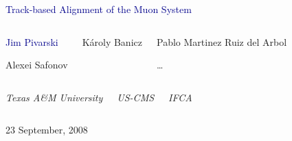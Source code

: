 \documentclass[compress]{beamer}
\begin{document}
\begin{frame}
\vfill
\begin{center}
\textcolor{darkblue}{\Large Track-based Alignment of the Muon System}

\vfill
\begin{columns}
\begin{center}
\large
\textcolor{darkblue}{Jim Pivarski}

\vspace{0.2 cm}
Alexei Safonov
\end{center}

\begin{center}
\large
K\'aroly Banicz
\end{center}

\begin{center}
\large
Pablo Martinez Ruiz del Arbol

\vspace{0.2 cm}
\ldots
\end{center}
\end{columns}

\begin{columns}
\begin{center}
\scriptsize
{\it Texas A\&M University}
\end{center}
\begin{center}
\scriptsize
{\it US-CMS}
\end{center}
\begin{center}
\scriptsize
{\it IFCA}
\end{center}
\end{columns}

\vfill
23 September, 2008

\end{center}
\end{frame}

\end{document}
